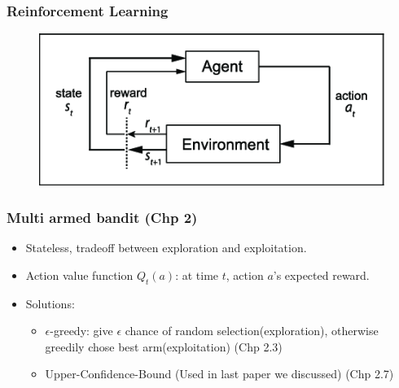 \begin{frame}
    \frametitle{Reinforcement Learning}
    \begin{figure}
        \centering
        \includegraphics[height=0.3\textheight]{figs/rl.png}
    \end{figure}
\end{frame}

\begin{frame}
    \frametitle{Multi armed bandit (Chp 2)}
    \begin{itemize}
        \item Stateless, tradeoff between exploration and exploitation.
        \item Action value function $Q_t(a)$: at time $t$, action $a$'s expected reward.
        \item Solutions:
              \begin{itemize}
                  \item $\epsilon$-greedy: give $\epsilon$ chance of random selection(exploration), otherwise greedily chose best arm(exploitation) (Chp 2.3)
                  \item Upper-Confidence-Bound (Used in last paper we discussed) (Chp 2.7)
              \end{itemize}
    \end{itemize}
\end{frame}

